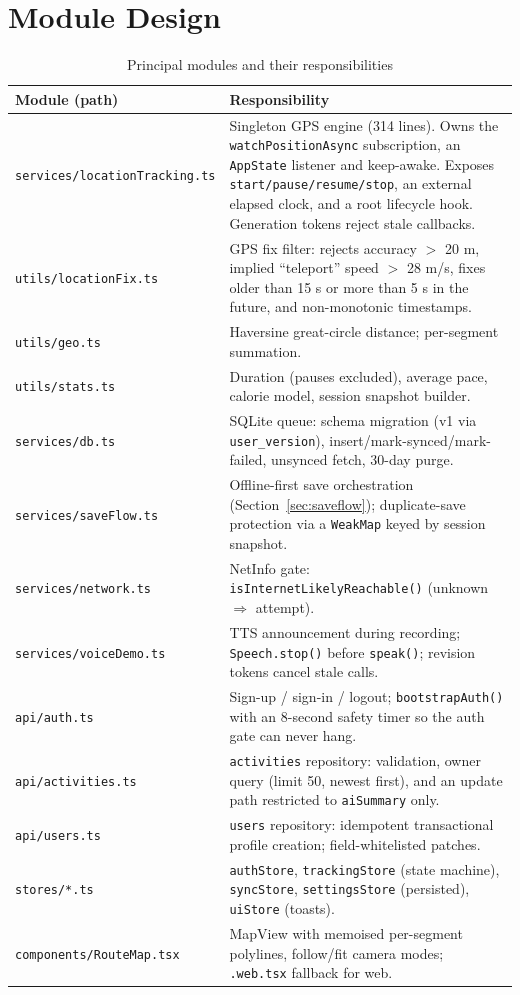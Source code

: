 \documentclass[11pt,a4paper]{report}
\begin{document}
\section{Module Design}
\begin{table}[htbp]
\centering
\caption{Principal modules and their responsibilities}
\begin{tabular}{p{4.6cm} p{10.4cm}}
\toprule
\textbf{Module (path)} & \textbf{Responsibility} \\
\midrule
\texttt{services/locationTracking.ts} & Singleton GPS engine (314 lines). Owns the \texttt{watchPositionAsync} subscription, an \texttt{AppState} listener and keep-awake. Exposes \texttt{start/pause/resume/stop}, an external elapsed clock, and a root lifecycle hook. Generation tokens reject stale callbacks. \\
\texttt{utils/locationFix.ts} & GPS fix filter: rejects accuracy $>$ 20 m, implied ``teleport'' speed $>$ 28 m/s, fixes older than 15 s or more than 5 s in the future, and non-monotonic timestamps. \\
\texttt{utils/geo.ts} & Haversine great-circle distance; per-segment summation. \\
\texttt{utils/stats.ts} & Duration (pauses excluded), average pace, calorie model, session snapshot builder. \\
\texttt{services/db.ts} & SQLite queue: schema migration (v1 via \texttt{user\_version}), insert/mark-synced/mark-failed, unsynced fetch, 30-day purge. \\
\texttt{services/saveFlow.ts} & Offline-first save orchestration (Section~\ref{sec:saveflow}); duplicate-save protection via a \texttt{WeakMap} keyed by session snapshot. \\
\texttt{services/network.ts} & NetInfo gate: \texttt{isInternetLikelyReachable()} (unknown $\Rightarrow$ attempt). \\
\texttt{services/voiceDemo.ts} & TTS announcement during recording; \texttt{Speech.stop()} before \texttt{speak()}; revision tokens cancel stale calls. \\
\texttt{api/auth.ts} & Sign-up / sign-in / logout; \texttt{bootstrapAuth()} with an 8-second safety timer so the auth gate can never hang. \\
\texttt{api/activities.ts} & \texttt{activities} repository: validation, owner query (limit 50, newest first), and an update path restricted to \texttt{aiSummary} only. \\
\texttt{api/users.ts} & \texttt{users} repository: idempotent transactional profile creation; field-whitelisted patches. \\
\texttt{stores/*.ts} & \texttt{authStore}, \texttt{trackingStore} (state machine), \texttt{syncStore}, \texttt{settingsStore} (persisted), \texttt{uiStore} (toasts). \\
\texttt{components/RouteMap.tsx} & MapView with memoised per-segment polylines, follow/fit camera modes; \texttt{.web.tsx} fallback for web. \\
\bottomrule
\end{tabular}
\end{table}
\end{document}

